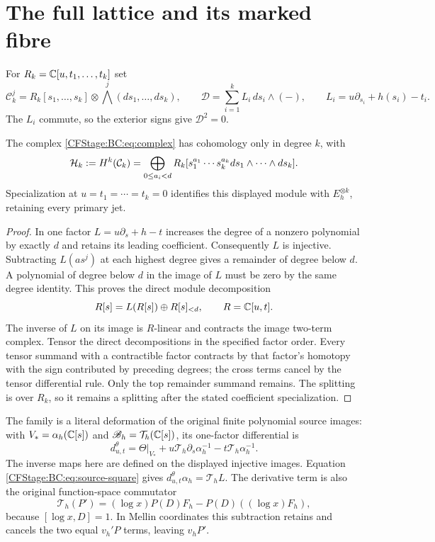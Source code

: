 \section{The full lattice and its marked fibre}

For $R_k=\mathbb C[u,t_1,\ldots,t_k]$ set
\begin{equation}
 \mathcal C_k^j=R_k[s_1,\ldots,s_k]\otimes
                  \bigwedge^j(ds_1,\ldots,ds_k),\qquad
 \mathcal D=\sum_{i=1}^k L_i\,ds_i\wedge(-),\qquad
 L_i=u\partial_{s_i}+h(s_i)-t_i.
 \label{CFStage:BC:eq:complex}
\end{equation}
The $L_i$ commute, so the exterior signs give $\mathcal D^2=0$.

\begin{proposition}
The complex \eqref{CFStage:BC:eq:complex} has cohomology only in degree $k$, with
\begin{equation}
 \mathcal H_k:=H^k(\mathcal C_k)
   =\bigoplus_{0\le a_i<d}R_k
       [s_1^{a_1}\cdots s_k^{a_k}ds_1\wedge\cdots\wedge ds_k].
 \label{CFStage:BC:eq:lattice}
\end{equation}
Specialization at $u=t_1=\cdots=t_k=0$ identifies this displayed
module with $E_h^{\otimes k}$, retaining every primary jet.
\end{proposition}
\begin{proof}
In one factor $L=u\partial_s+h-t$ increases the degree of a nonzero
polynomial by exactly $d$ and retains its leading coefficient.
Consequently $L$ is injective.  Subtracting $L(as^j)$ at each highest
degree gives a remainder of degree below $d$.  A polynomial of degree
below $d$ in the image of $L$ must be zero by the same degree identity.
This proves the direct module decomposition
\[
 R[s]=L(R[s])\oplus R[s]_{<d},\qquad R=\mathbb C[u,t].
\]
The inverse of $L$ on its image is $R$-linear and contracts the image
two-term complex.  Tensor the direct decompositions in the specified
factor order.  Every tensor summand with a contractible factor contracts
by that factor's homotopy with the sign contributed by preceding degrees;
the cross terms cancel by the tensor differential rule.  Only the top
remainder summand remains.  The splitting is over $R_k$, so it remains a
splitting after the stated coefficient specialization.
\end{proof}

The family is a literal deformation of the original finite polynomial
source images: with $V_* =\alpha_h(\mathbb C[s])$ and
$\mathscr B_h=\mathcal T_h(\mathbb C[s])$, its one-factor differential is
\begin{equation}
 d^\theta_{u,t}=\Theta|_{V_*}
       +u\mathcal T_h\partial_s\alpha_h^{-1}
       -t\mathcal T_h\alpha_h^{-1}.
\end{equation}
The inverse maps here are defined on the displayed injective images.
Equation \eqref{CFStage:BC:eq:source-square} gives
$d^\theta_{u,t}\alpha_h=\mathcal T_hL$.
The derivative term is also the original function-space commutator
\[
 \mathcal T_h(P')=(\log x)P(D)F_h-P(D)((\log x)F_h),
\]
because $[\log x,D]=1$.  In Mellin coordinates this subtraction
retains and cancels the two equal $v_h'P$ terms, leaving $v_hP'$.

